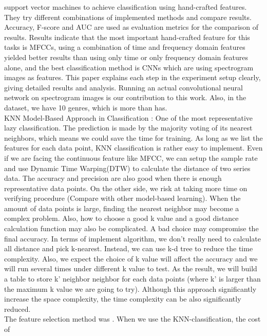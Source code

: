 \documentclass[acmtog, authorversion]{acmart}
\begin{document}
support vector machines to achieve classification using hand-crafted features. They try different combinations of implemented methods and compare results.
 Accuracy, F-score and AUC are used as evaluation metrics for the comparison of results. Results indicate that the most important hand-crafted feature for
  this tasks is MFCCs, using a combination of time and frequency domain features yielded better results than using only time or only frequency domain 
  features alone, and the best classification method is CNNs which are using spectrogram images as features. This paper explains each step in the experiment
   setup clearly, giving detailed results and analysis. Running an actual convolutional neural network on spectrogram images is our contribution to this work.
   Also, in the dataset, we have 10 genres, which is more than \cite{bahuleyan2018music} has.\\
KNN Model-Based Approach in Classification \cite{Guo2003knn}: One of the most representative lazy classification. The prediction is made by the majority 
voting of its nearest neighbors, which means we could save the time for training. As long as we list the features for each data point, KNN classification 
is rather easy to implement. Even if we are facing the continuous feature like MFCC, we can setup the sample rate and use Dynamic Time Warping(DTW)\cite{tang2010dtw} to calculate the distance of two series data. The accuracy and precision are also good when there is enough representative data points. On the other side, 
we risk at taking more time on verifying procedure (Compare with other model-based learning). When the amount of data points is large, finding the 
nearest neighbor may become a complex problem. Also, how to choose a good k value and a good distance calculation function may also be complicated. A bad 
choice may compromise the final accuracy.
In terms of implement algorithm, we don’t really need to calculate all distance and pick k-nearest. Instead, we can use k-d tree to reduce the time 
complexity. Also, we expect the choice of k value will affect the accuracy and we will run several times under different k value to test. As the result, 
we will build a table to store k’ neighbor neighbor for each data points (where k’ is larger than the maximum k value we are going to try). Although this 
approach significantly increase the space complexity, the time complexity can be also significantly reduced. \\
The feature selection method was \cite{tang2014feature}. When we use the KNN-classification, the cost of 
\end{document}
